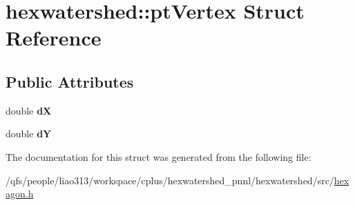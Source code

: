 \hypertarget{structhexwatershed_1_1ptVertex}{\section{hexwatershed\-:\-:pt\-Vertex Struct Reference}
\label{structhexwatershed_1_1ptVertex}
}
\subsection*{Public Attributes}
\begin{DoxyCompactItemize}
\item 
\hypertarget{structhexwatershed_1_1ptVertex_aee0ff8dfba2b22b27fba81d249e828aa}{double {\bfseries d\-X}}\label{structhexwatershed_1_1ptVertex_aee0ff8dfba2b22b27fba81d249e828aa}

\item 
\hypertarget{structhexwatershed_1_1ptVertex_acd4e11033877bae01f92d06efb906add}{double {\bfseries d\-Y}}\label{structhexwatershed_1_1ptVertex_acd4e11033877bae01f92d06efb906add}

\end{DoxyCompactItemize}


The documentation for this struct was generated from the following file\-:\begin{DoxyCompactItemize}
\item 
/qfs/people/liao313/workspace/cplus/hexwatershed\-\_\-pnnl/hexwatershed/src/\hyperlink{hexagon_8h}{hexagon.\-h}\end{DoxyCompactItemize}
